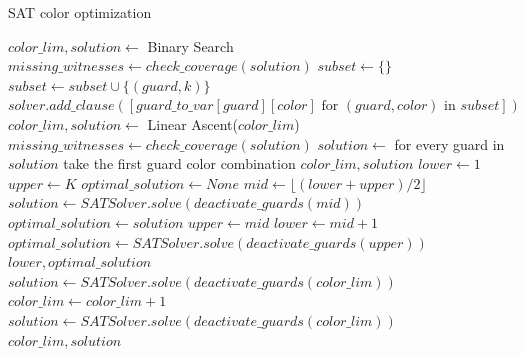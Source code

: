 \begin{algorithm}
\caption{SAT color optimization}\label{alg:SAT_color_opt}
\begin{algorithmic}[1]
    \State $color\_lim, solution \gets$ Binary Search
    \State $missing\_witnesses \gets check\_coverage(solution)$
            \State $subset \gets \{\}$
                    \State $subset\gets subset\cup \{(guard, k)\}$
                \EndFor
            \EndFor
            \State $solver.add\_clause([guard\_to\_var[guard][color] \text{ for } (guard, color) \text{ in } subset])$
        \EndFor
        \State $color\_lim, solution \gets$ Linear Ascent($color\_lim$)
        \State $missing\_witnesses \gets check\_coverage(solution)$
    \EndWhile
    \State $solution \gets$ for every guard in $solution$ take the first guard color combination
    \State \Return $color\_lim, solution$
\EndProcedure
{}
    \State $lower \gets 1$
    \State $upper \gets K$
    \State $optimal\_solution \gets None$
        \State $mid \gets \lfloor(lower + upper) / 2\rfloor$
        \State $solution \gets SATSolver.solve(deactivate\_guards(mid))$
            \State $optimal\_solution \gets solution$
            \State $upper \gets mid$
        \Else
            \State $lower \gets mid + 1$
        \EndIf
    \EndWhile
        \State $optimal\_solution \gets SATSolver.solve(deactivate\_guards(upper))$
    \EndIf
    \State \Return $lower, optimal\_solution$
\EndProcedure
{}
    \State $solution \gets SATSolver.solve(deactivate\_guards(color\_lim))$
        \State $color\_lim \gets color\_lim + 1$
        \State $solution \gets SATSolver.solve(deactivate\_guards(color\_lim))$
    \EndWhile
    \State \Return $color\_lim, solution$
\EndProcedure
\end{algorithmic}
\end{algorithm}

